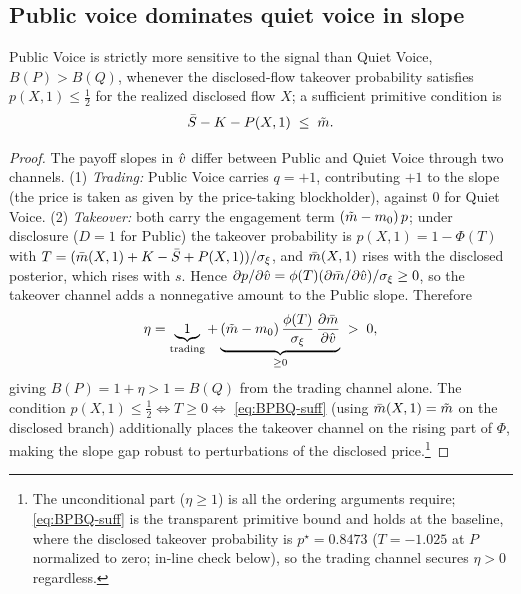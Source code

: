 \subsection{Public voice dominates quiet voice in slope}

\begin{lemma}[$B_P>B_Q$]
\label{lem:BP-BQ}
Public Voice is strictly more sensitive to the signal than Quiet Voice,
$B(P)>B(Q)$, whenever the disclosed-flow takeover probability satisfies
$p(X,1)\le\tfrac12$ for the realized disclosed flow $X$; a sufficient primitive
condition is
\begin{equation}
\label{eq:BPBQ-suff}
\bar{S}-K-P(X,1)\;\le\;\tilde{m} .
\end{equation}
\end{lemma}

\begin{proof}
The payoff slopes in $\hat{v}$ differ between Public and Quiet Voice through two
channels. (1) \emph{Trading:} Public Voice carries $q=+1$, contributing $+1$ to
the slope (the price is taken as given by the price-taking blockholder), against
$0$ for Quiet Voice. (2) \emph{Takeover:} both carry the engagement term
$(\tilde{m}-m_0)\,p$; under disclosure ($D=1$ for Public) the takeover probability is
$p(X,1)=1-\Phi(T)$ with $T=(\bar{m}(X,1)+K-\bar{S}+P(X,1))/\sigma_\xi$, and
$\bar{m}(X,1)$ rises with the disclosed posterior, which rises with $s$. Hence
$\partial p/\partial\hat{v}=\phi(T)(\partial\bar{m}/\partial\hat{v})/\sigma_\xi\ge0$, so
the takeover channel adds a nonnegative amount to the Public slope. Therefore
\[
\eta=\underbrace{1}_{\text{trading}}
+\underbrace{(\tilde{m}-m_0)\,\frac{\phi(T)}{\sigma_\xi}\,
\frac{\partial\bar{m}}{\partial\hat{v}}}_{\ge0}\;>\;0,
\]
giving $B(P)=1+\eta>1=B(Q)$ from the trading channel alone. The condition
$p(X,1)\le\tfrac12\iff T\ge0\iff$ \eqref{eq:BPBQ-suff} (using
$\bar{m}(X,1)=\tilde{m}$ on the disclosed branch) additionally places the takeover
channel on the rising part of $\Phi$, making the slope gap robust to
perturbations of the disclosed price.\footnote{The unconditional part
($\eta\ge1$) is all the ordering arguments require; \eqref{eq:BPBQ-suff} is the
transparent primitive bound and holds at the baseline, where the disclosed
takeover probability is $p^\star=0.8473$ ($T=-1.025$ at $P$ normalized to zero;
in-line check below), so the trading channel secures $\eta>0$ regardless.}
\end{proof}

